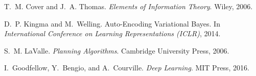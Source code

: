 \begin{thebibliography}{9}

  T.~M. Cover and J.~A. Thomas.
  \newblock \textit{Elements of Information Theory}.
  \newblock Wiley, 2006.
  
  D.~P. Kingma and M.~Welling.
  \newblock Auto-Encoding Variational Bayes.
  \newblock In \textit{International Conference on Learning Representations (ICLR)}, 2014.
  
  S.~M. LaValle.
  \newblock \textit{Planning Algorithms}.
  \newblock Cambridge University Press, 2006.
  
  I.~Goodfellow, Y.~Bengio, and A.~Courville.
  \newblock \textit{Deep Learning}.
  \newblock MIT Press, 2016.
  
  \end{thebibliography}
  